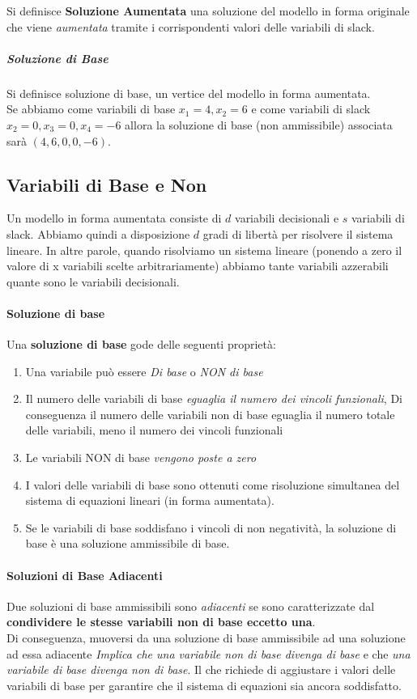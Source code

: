 \documentclass[12pt, a4paper, openany]{book}
\begin{document}
Si definisce \textbf{Soluzione Aumentata} una soluzione del modello in forma originale che viene \emph{aumentata} tramite i
corrispondenti valori delle variabili di slack.
\subparagraph*{Soluzione di Base}
Si definisce soluzione di base, un vertice del modello in forma aumentata.
\\Se abbiamo come variabili di base $x_1=4,x_2=6$ e come variabili di slack $x_2=0,x_3=0,x_4=-6$ allora la soluzione
di base (non ammissibile) associata sarà $(4,6,0,0,-6)$.
\subsection*{Variabili di Base e Non}
Un modello in forma aumentata consiste di $d$ variabili decisionali e $s$ variabili di slack.
Abbiamo quindi a disposizione $d$ gradi di libertà per risolvere il sistema lineare.
In altre parole, quando risolviamo un sistema lineare (ponendo a zero il valore di x variabili scelte arbitrariamente)
abbiamo tante variabili azzerabili quante sono le variabili decisionali.
\paragraph*{Soluzione di base}
Una \textbf{soluzione di base} gode delle seguenti proprietà:
\begin{enumerate} %
    \item Una variabile può essere \emph{Di base} o \emph{NON di base}
    \item Il numero delle variabili di base \emph{eguaglia il numero dei vincoli funzionali},
          Di conseguenza il numero delle variabili non di base eguaglia il numero totale delle variabili, meno il numero dei vincoli funzionali
    \item Le variabili NON di base \emph{vengono poste a zero}
    \item I valori delle variabili di base sono ottenuti come risoluzione simultanea del sistema di equazioni lineari (in forma aumentata).
    \item Se le variabili di base soddisfano i vincoli di non negatività, la soluzione di base è una soluzione ammissibile di base.
\end{enumerate}
\paragraph{Soluzioni di Base Adiacenti}
Due soluzioni di base ammissibili sono \emph{adiacenti} se sono caratterizzate dal \textbf{condividere le stesse variabili non di base eccetto una}.
\\Di conseguenza, muoversi da una soluzione di base ammissibile ad una soluzione ad essa adiacente
\emph{Implica che una variabile non di base divenga di base} e che \emph{una variabile di base divenga non di base}.
Il che richiede di aggiustare i valori delle variabili di base per garantire che il sistema di equazioni sia ancora soddisfatto.
\end{document}
